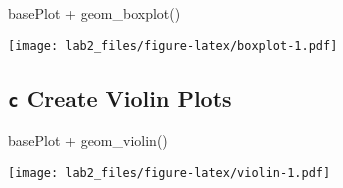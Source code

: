 \documentclass[
  12pt,
]{article}
\newenvironment{Shaded}{\begin{snugshade}}{\end{snugshade}}
\newcommand{\FunctionTok}[1]{\textcolor[rgb]{0.00,0.00,0.00}{#1}}
\newcommand{\NormalTok}[1]{#1}
\newcommand{\SpecialCharTok}[1]{\textcolor[rgb]{0.00,0.00,0.00}{#1}}
\begin{document}
\begin{Shaded}
\begin{Highlighting}[]
\NormalTok{basePlot }\SpecialCharTok{+} \FunctionTok{geom\_boxplot}\NormalTok{()}
\end{Highlighting}
\end{Shaded}

\texttt{[image: lab2\_files/figure-latex/boxplot-1.pdf]}

\hypertarget{c-create-violin-plots}{%
\subsection{\texorpdfstring{\texttt{c} Create Violin
Plots}{c Create Violin Plots}}\label{c-create-violin-plots}}

\begin{Shaded}
\begin{Highlighting}[]
\NormalTok{basePlot }\SpecialCharTok{+} \FunctionTok{geom\_violin}\NormalTok{()}
\end{Highlighting}
\end{Shaded}

\texttt{[image: lab2\_files/figure-latex/violin-1.pdf]}
\end{document}
